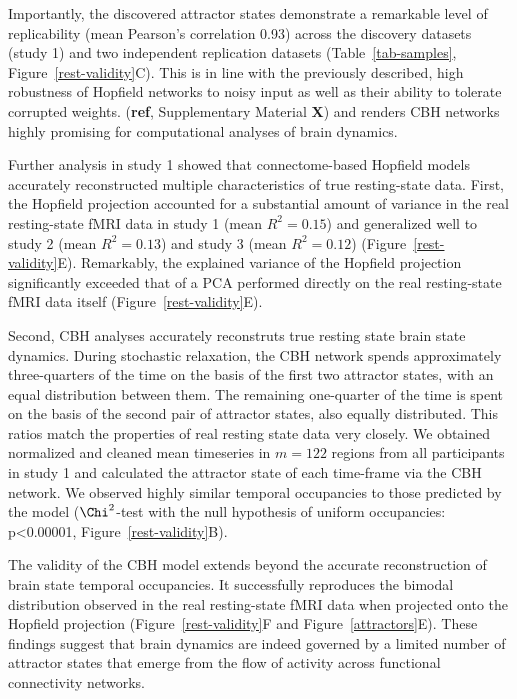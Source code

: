 \documentclass{article}
\begin{document}
Importantly, the discovered attractor states demonstrate a remarkable level of replicability (mean Pearson's
correlation 0.93) across the discovery datasets (study 1) and two independent replication datasets
(Table~\ref{tab-samples}, Figure~\ref{rest-validity}C). This is in line with the previously described, high
robustness of Hopfield networks to noisy input \citep{hopfield1982neural} as well as their ability to tolerate
corrupted weights. (\textbf{ref}, Supplementary Material \textbf{X}) and renders CBH networks highly promising for computational
analyses of brain dynamics.

Further analysis in study 1 showed that connectome-based Hopfield models accurately reconstructed multiple
characteristics of true resting-state data. First, the Hopfield projection accounted for a substantial amount of
variance in the real resting-state fMRI data in study 1 (mean $R^2=0.15$) and generalized well to study 2
(mean $R^2=0.13$) and study 3 (mean $R^2=0.12$) (Figure~\ref{rest-validity}E). Remarkably, the explained variance of the
Hopfield projection significantly exceeded that of a PCA performed directly on the real resting-state fMRI data itself
(Figure~\ref{rest-validity}E).

Second, CBH analyses accurately reconstruts true resting state brain state dynamics. During stochastic relaxation, the
CBH network spends approximately three-quarters of the time on the basis of the first two attractor states, with an
equal distribution between them. The remaining one-quarter of the time is spent on the basis of the second pair of
attractor states, also equally distributed. This ratios match the properties of real resting state data very closely.
We obtained normalized and cleaned mean timeseries in $m=122$ regions from all participants in study 1 and calculated
the attractor state of each time-frame via the CBH network. We observed highly similar temporal occupancies to those
predicted by the model ($\Chi^2$-test with the null hypothesis of uniform occupancies: p\textless 0.00001,
Figure~\ref{rest-validity}B).

The validity of the CBH model extends beyond the accurate reconstruction of brain state temporal occupancies. It
successfully reproduces the bimodal distribution observed in the real resting-state fMRI data when projected onto the
Hopfield projection (Figure~\ref{rest-validity}F and Figure~\ref{attractors}E). These findings suggest that brain dynamics
are indeed governed by a limited number of attractor states that emerge from the flow of activity across functional
connectivity networks.
\end{document}

